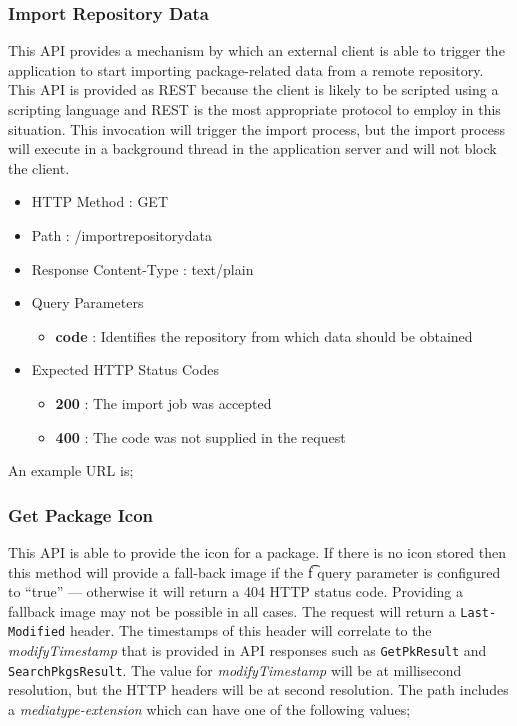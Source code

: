 \subsubsection{Import Repository Data}
\label{api-importrepositorydata}

This API provides a mechanism by which an external client is able to trigger the application to start importing package-related data from a remote repository.  This API is provided as REST because the client is likely to be scripted using a scripting language and REST is the most appropriate protocol to employ in this situation.  This invocation will trigger the import process, but the import process will execute in a background thread in the application server and will not block the client.

\begin{itemize}
\item HTTP Method : GET
\item Path : /importrepositorydata
\item Response Content-Type : text/plain
\item Query Parameters
  \begin{itemize}
  \item {\bf code} : Identifies the repository from which data should be obtained
  \end{itemize}
\item Expected HTTP Status Codes
  \begin{itemize}
  \item {\bf 200} : The import job was accepted
  \item {\bf 400} : The code was not supplied in the request
  \end{itemize}
\end{itemize}

An example URL is;


\subsubsection{Get Package Icon}

This API is able to provide the icon for a package.  If there is no icon stored then this method will provide a fall-back image if the {\t f} query parameter is configured to ``true'' --- otherwise it will return a 404 HTTP status code.  Providing a fallback image may not be possible in all cases.  The request will return a {\tt Last-Modified} header.  The timestamps of this header will correlate to the {\it modifyTimestamp} that is provided in API responses such as {\tt GetPkResult} and {\tt SearchPkgsResult}.  The value for {\it modifyTimestamp} will be at millisecond resolution, but the HTTP headers will be at second resolution.  The path includes a {\it mediatype-extension} which can have one of the following values;

